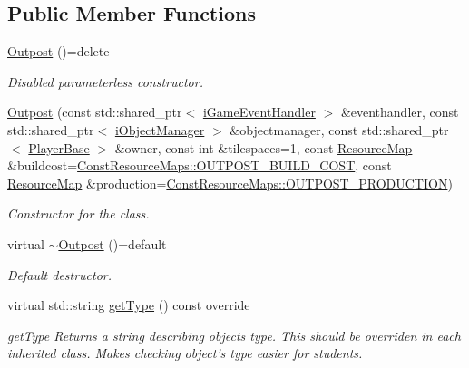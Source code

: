 \subsection*{Public Member Functions}
\begin{DoxyCompactItemize}
\item 
\hyperlink{classCourse_1_1Outpost_a3b69759306e036223cfd991337c8b4e2}{Outpost} ()=delete
\begin{DoxyCompactList}\small\item\em Disabled parameterless constructor. \end{DoxyCompactList}\item 
\hyperlink{classCourse_1_1Outpost_aa8f768ade225127da85fe4dd9c2c892d}{Outpost} (const std\-::shared\-\_\-ptr$<$ \hyperlink{classCourse_1_1iGameEventHandler}{i\-Game\-Event\-Handler} $>$ \&eventhandler, const std\-::shared\-\_\-ptr$<$ \hyperlink{classCourse_1_1iObjectManager}{i\-Object\-Manager} $>$ \&objectmanager, const std\-::shared\-\_\-ptr$<$ \hyperlink{classCourse_1_1PlayerBase}{Player\-Base} $>$ \&owner, const int \&tilespaces=1, const \hyperlink{namespaceCourse_ab9a46ed9cd00485e318e5731ea2f78d9}{Resource\-Map} \&buildcost=\hyperlink{namespaceCourse_1_1ConstResourceMaps_a0baa840c24b118a34043afeb268c4408}{Const\-Resource\-Maps\-::\-O\-U\-T\-P\-O\-S\-T\-\_\-\-B\-U\-I\-L\-D\-\_\-\-C\-O\-S\-T}, const \hyperlink{namespaceCourse_ab9a46ed9cd00485e318e5731ea2f78d9}{Resource\-Map} \&production=\hyperlink{namespaceCourse_1_1ConstResourceMaps_ae91bf6e7a36ca76016f6d149e94a3e9d}{Const\-Resource\-Maps\-::\-O\-U\-T\-P\-O\-S\-T\-\_\-\-P\-R\-O\-D\-U\-C\-T\-I\-O\-N})
\begin{DoxyCompactList}\small\item\em Constructor for the class. \end{DoxyCompactList}\item 
virtual \hyperlink{classCourse_1_1Outpost_aed6c03ab76797cac0712b1d88660ce14}{$\sim$\-Outpost} ()=default
\begin{DoxyCompactList}\small\item\em Default destructor. \end{DoxyCompactList}\item 
virtual std\-::string \hyperlink{classCourse_1_1Outpost_a8c89c67187451e0a49ecd57d4fc80602}{get\-Type} () const override
\begin{DoxyCompactList}\small\item\em get\-Type Returns a string describing objects type. This should be overriden in each inherited class. Makes checking object's type easier for students. \end{DoxyCompactList}\item 

\end{DoxyCompactItemize}
